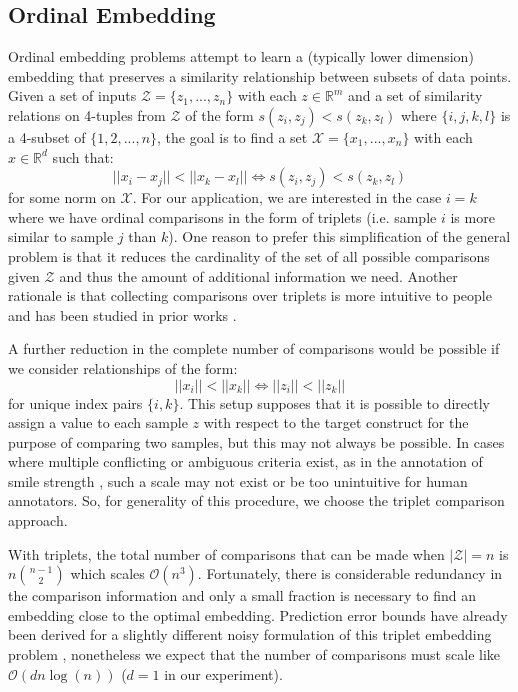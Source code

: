 \documentclass[10pt,letterpaper]{article}
\begin{document}
\subsection*{Ordinal Embedding}
Ordinal embedding problems attempt to learn a (typically lower dimension) embedding that preserves a similarity relationship between subsets of data points.  Given a set of inputs $\mathcal{Z} = \{z_1,...,z_n\}$ with each $z \in \mathbb{R}^m$ and a set of similarity relations on 4-tuples from $\mathcal{Z}$ of the form $s(z_i,z_j) < s(z_k,z_l)$ where $\{i,j,k,l\}$ is a 4-subset of $\{1,2,...,n\}$, the goal is to find a set $\mathcal{X} = \{x_1,...,x_n\}$ with each $x \in \mathbb{R}^d$ such that:
\begin{equation*}
||x_i-x_j|| < ||x_k-x_l|| \Longleftrightarrow s(z_i,z_j) < s(z_k,z_l)
\end{equation*}
\noindent
for some norm on $\mathcal{X}$. For our application, we are interested in the case $i=k$ where we have ordinal comparisons in the form of triplets (i.e. sample $i$ is more similar to sample $j$ than $k$).  One reason to prefer this simplification of the general problem is that it reduces the cardinality of the set of all possible comparisons given $\mathcal{Z}$ and thus the amount of additional information we need.  Another rationale is that collecting comparisons over triplets is more intuitive to people and has been studied in prior works \cite{jain2016finite, van2012stochastic}.

A further reduction in the complete number of comparisons would be possible if we consider relationships of the form:
\begin{equation*}
||x_i|| < ||x_k|| \Longleftrightarrow ||z_i|| < ||z_k||
\end{equation*}
for unique index pairs $\{i,k\}$.  This setup supposes that it is possible to directly assign a value to each sample $z$ with respect to the target construct for the purpose of comparing two samples, but this may not always be possible.  In cases where multiple conflicting or ambiguous criteria exist, as in the annotation of smile strength \cite{Gupta2016}, such a scale may not exist or be too unintuitive for human annotators.  So, for generality of this procedure, we choose the triplet comparison approach.

With triplets, the total number of comparisons that can be made when $|\mathcal{Z}|=n$ is $n\binom{n-1}{2}$ which scales $\mathcal{O}(n^3)$.  Fortunately, there is considerable redundancy in the comparison information and only a small fraction is necessary to find an embedding close to the optimal embedding.  Prediction error bounds have already been derived for a slightly different noisy formulation of this triplet embedding problem \cite{jain2016finite}, nonetheless we expect that the number of comparisons must scale like $\mathcal{O}(d n\log(n))$ ($d=1$ in our experiment).
\end{document}
